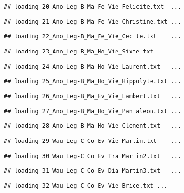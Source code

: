 \documentclass[]{article}
\begin{document}
\begin{verbatim}
## loading 20_Ano_Leg-B_Ma_Fe_Vie_Felicite.txt  ...
\end{verbatim}

\begin{verbatim}
## loading 21_Ano_Leg-B_Ma_Fe_Vie_Christine.txt ...
\end{verbatim}

\begin{verbatim}
## loading 22_Ano_Leg-B_Ma_Fe_Vie_Cecile.txt    ...
\end{verbatim}

\begin{verbatim}
## loading 23_Ano_Leg-B_Ma_Ho_Vie_Sixte.txt ...
\end{verbatim}

\begin{verbatim}
## loading 24_Ano_Leg-B_Ma_Ho_Vie_Laurent.txt   ...
\end{verbatim}

\begin{verbatim}
## loading 25_Ano_Leg-B_Ma_Ho_Vie_Hippolyte.txt ...
\end{verbatim}

\begin{verbatim}
## loading 26_Ano_Leg-B_Ma_Ev_Vie_Lambert.txt   ...
\end{verbatim}

\begin{verbatim}
## loading 27_Ano_Leg-B_Ma_Ho_Vie_Pantaleon.txt ...
\end{verbatim}

\begin{verbatim}
## loading 28_Ano_Leg-B_Ma_Ho_Vie_Clement.txt   ...
\end{verbatim}

\begin{verbatim}
## loading 29_Wau_Leg-C_Co_Ev_Vie_Martin.txt    ...
\end{verbatim}

\begin{verbatim}
## loading 30_Wau_Leg-C_Co_Ev_Tra_Martin2.txt   ...
\end{verbatim}

\begin{verbatim}
## loading 31_Wau_Leg-C_Co_Ev_Dia_Martin3.txt   ...
\end{verbatim}

\begin{verbatim}
## loading 32_Wau_Leg-C_Co_Ev_Vie_Brice.txt ...
\end{verbatim}
\end{document}
